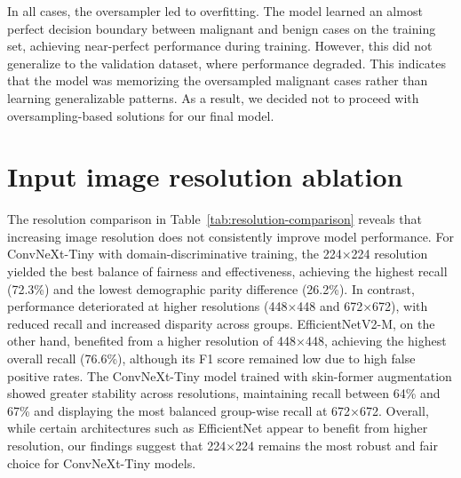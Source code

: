 In all cases, the oversampler led to overfitting. The model learned an almost perfect decision boundary between malignant and benign cases on the training set, achieving near-perfect performance during training. However, this did not generalize to the validation dataset, where performance degraded. This indicates that the model was memorizing the oversampled malignant cases rather than learning generalizable patterns. As a result, we decided not to proceed with oversampling-based solutions for our final model.


\begin{table}[H]
\centering
\caption{Ablation study: Oversampler with different loss functions on ConvNeXt-Tiny using 224x224 CIELAB images}
\label{tab:oversampler-loss-ablation}
\end{table}

\section{Input image resolution ablation}

The resolution comparison in Table~\ref{tab:resolution-comparison} reveals that increasing image resolution does not consistently improve model performance. For ConvNeXt-Tiny with domain-discriminative training, the 224×224 resolution yielded the best balance of fairness and effectiveness, achieving the highest recall (72.3\%) and the lowest demographic parity difference (26.2\%). In contrast, performance deteriorated at higher resolutions (448×448 and 672×672), with reduced recall and increased disparity across groups. EfficientNetV2-M, on the other hand, benefited from a higher resolution of 448×448, achieving the highest overall recall (76.6\%), although its F1 score remained low due to high false positive rates. The ConvNeXt-Tiny model trained with skin-former augmentation showed greater stability across resolutions, maintaining recall between 64\% and 67\% and displaying the most balanced group-wise recall at 672×672. Overall, while certain architectures such as EfficientNet appear to benefit from higher resolution, our findings suggest that 224×224 remains the most robust and fair choice for ConvNeXt-Tiny models.


